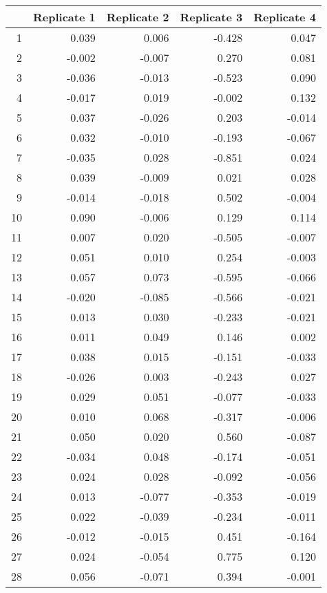 \begin{table}[ht]
\centering
\begin{tabular}{rrrrr}
  \hline
 & Replicate 1 & Replicate 2 & Replicate 3 & Replicate 4 \\ 
  \hline
1 & 0.039 & 0.006 & -0.428 & 0.047 \\ 
  2 & -0.002 & -0.007 & 0.270 & 0.081 \\ 
  3 & -0.036 & -0.013 & -0.523 & 0.090 \\ 
  4 & -0.017 & 0.019 & -0.002 & 0.132 \\ 
  5 & 0.037 & -0.026 & 0.203 & -0.014 \\ 
  6 & 0.032 & -0.010 & -0.193 & -0.067 \\ 
  7 & -0.035 & 0.028 & -0.851 & 0.024 \\ 
  8 & 0.039 & -0.009 & 0.021 & 0.028 \\ 
  9 & -0.014 & -0.018 & 0.502 & -0.004 \\ 
  10 & 0.090 & -0.006 & 0.129 & 0.114 \\ 
  11 & 0.007 & 0.020 & -0.505 & -0.007 \\ 
  12 & 0.051 & 0.010 & 0.254 & -0.003 \\ 
  13 & 0.057 & 0.073 & -0.595 & -0.066 \\ 
  14 & -0.020 & -0.085 & -0.566 & -0.021 \\ 
  15 & 0.013 & 0.030 & -0.233 & -0.021 \\ 
  16 & 0.011 & 0.049 & 0.146 & 0.002 \\ 
  17 & 0.038 & 0.015 & -0.151 & -0.033 \\ 
  18 & -0.026 & 0.003 & -0.243 & 0.027 \\ 
  19 & 0.029 & 0.051 & -0.077 & -0.033 \\ 
  20 & 0.010 & 0.068 & -0.317 & -0.006 \\ 
  21 & 0.050 & 0.020 & 0.560 & -0.087 \\ 
  22 & -0.034 & 0.048 & -0.174 & -0.051 \\ 
  23 & 0.024 & 0.028 & -0.092 & -0.056 \\ 
  24 & 0.013 & -0.077 & -0.353 & -0.019 \\ 
  25 & 0.022 & -0.039 & -0.234 & -0.011 \\ 
  26 & -0.012 & -0.015 & 0.451 & -0.164 \\ 
  27 & 0.024 & -0.054 & 0.775 & 0.120 \\ 
  28 & 0.056 & -0.071 & 0.394 & -0.001 \\ 

\end{tabular}
\end{table}
